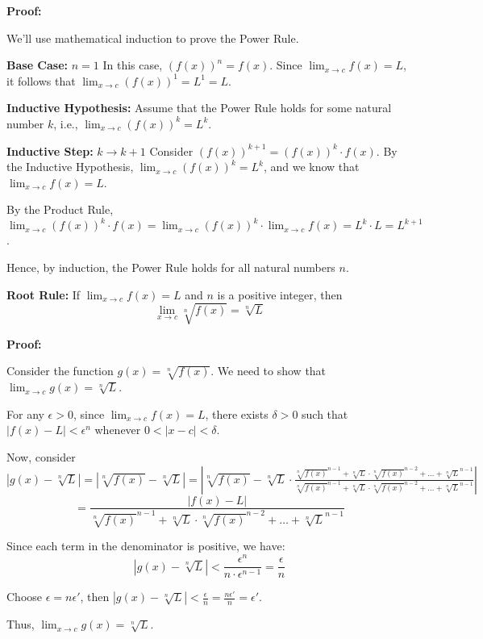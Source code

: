 \textbf{Proof:} \begin{outline}
We'll use mathematical induction to prove the Power Rule.

\textbf{Base Case:} $n = 1$
In this case, $(f(x))^n = f(x)$. Since $\lim_{x \to c} f(x) = L$, it follows that $\lim_{x \to c} (f(x))^1 = L^1 = L$.

\textbf{Inductive Hypothesis:}
Assume that the Power Rule holds for some natural number $k$, i.e., $\lim_{x \to c} (f(x))^k = L^k$.

\textbf{Inductive Step:} $k \rightarrow k+1$
Consider $(f(x))^{k+1} = (f(x))^k \cdot f(x)$. By the Inductive Hypothesis, $\lim_{x \to c} (f(x))^k = L^k$, and we know that $\lim_{x \to c} f(x) = L$.

By the Product Rule, $\lim_{x \to c} (f(x))^k \cdot f(x) = \lim_{x \to c} (f(x))^k \cdot \lim_{x \to c} f(x) = L^k \cdot L = L^{k+1}$.

Hence, by induction, the Power Rule holds for all natural numbers $n$.

\end{outline} \vspace{1cm} \hline

\textbf{Root Rule:} If $\lim_{x \to c} f(x) = L$ and $n$ is a positive integer, then
\[ \lim_{x \to c} \sqrt[n]{f(x)} = \sqrt[n]{L} \]

\textbf{Proof:} \begin{outline}
Consider the function $g(x) = \sqrt[n]{f(x)}$. We need to show that $\lim_{x \to c} g(x) = \sqrt[n]{L}$.

For any $\epsilon > 0$, since $\lim_{x \to c} f(x) = L$, there exists $\delta > 0$ such that $|f(x) - L| < \epsilon^n$ whenever $0 < |x - c| < \delta$.

Now, consider $|g(x) - \sqrt[n]{L}| = |\sqrt[n]{f(x)} - \sqrt[n]{L}| = |\sqrt[n]{f(x)} - \sqrt[n]{L} \cdot \frac{\sqrt[n]{f(x)}^{n-1} + \sqrt[n]{L} \cdot \sqrt[n]{f(x)}^{n-2} + \ldots + \sqrt[n]{L}^{n-1}}{\sqrt[n]{f(x)}^{n-1} + \sqrt[n]{L} \cdot \sqrt[n]{f(x)}^{n-2} + \ldots + \sqrt[n]{L}^{n-1}}|$
\[ = \frac{|f(x) - L|}{\sqrt[n]{f(x)}^{n-1} + \sqrt[n]{L} \cdot \sqrt[n]{f(x)}^{n-2} + \ldots + \sqrt[n]{L}^{n-1}} \]

Since each term in the denominator is positive, we have:
\[ |g(x) - \sqrt[n]{L}| < \frac{\epsilon^n}{n \cdot \epsilon^{n-1}} = \frac{\epsilon}{n} \]

Choose $\epsilon = n \epsilon'$, then $|g(x) - \sqrt[n]{L}| < \frac{\epsilon}{n} = \frac{n \epsilon'}{n} = \epsilon'$.

Thus, $\lim_{x \to c} g(x) = \sqrt[n]{L}$.

\end{outline} \vspace{1cm} \hline

